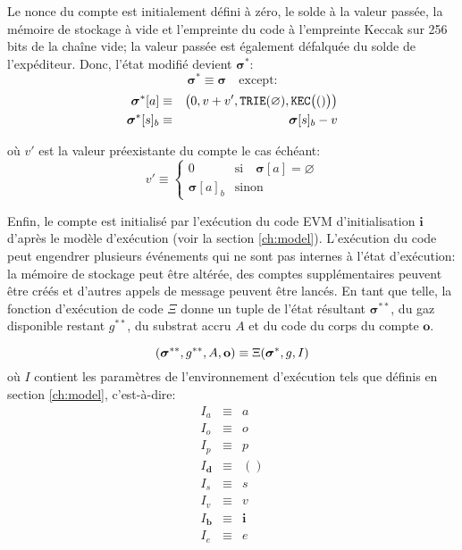 \documentclass[9pt,oneside]{amsart}
\begin{document}
\begin{multicols}{2}
Le nonce du compte est initialement défini à zéro, le solde à la valeur passée, la mémoire de stockage à vide et l'empreinte du code à l'empreinte Keccak sur 256 bits de la chaîne vide; la valeur passée est également défalquée du solde de l'expéditeur. Donc, l'état modifié devient $\boldsymbol{\sigma}^*$:
\begin{equation}
\boldsymbol{\sigma}^* \equiv \boldsymbol{\sigma} \quad \text{except:}
\end{equation}
\begin{eqnarray}
\boldsymbol{\sigma}^*[a] &\equiv& \big( 0, v + v', \mathtt{\tiny TRIE}(\varnothing), \mathtt{\tiny KEC}\big(()\big) \big) \\
\boldsymbol{\sigma}^*[s]_b &\equiv& \boldsymbol{\sigma}[s]_b - v
\end{eqnarray}

où $v'$ est la valeur préexistante du compte le cas échéant:
\begin{equation}
v' \equiv \begin{cases}
0 & \text{si} \quad \boldsymbol{\sigma}[a] = \varnothing\\
\boldsymbol{\sigma}[a]_b & \text{sinon}
\end{cases}
\end{equation}


Enfin, le compte est initialisé par l'exécution du code EVM d'initialisation $\mathbf{i}$ d'après le modèle d'exécution (voir la section \ref{ch:model}). L'exécution du code peut engendrer plusieurs événements qui ne sont pas internes à l'état d'exécution: la mémoire de stockage peut être altérée, des comptes supplémentaires peuvent être créés et d'autres appels de message peuvent être lancés. En tant que telle, la fonction d'exécution de code $\Xi$ donne un tuple de l'état résultant $\boldsymbol{\sigma}^{**}$, du gaz disponible restant $g^{**}$, du substrat accru $A$ et du code du corps du compte $\mathbf{o}$.

\begin{equation}
(\boldsymbol{\sigma}^{**}, g^{**}, A, \mathbf{o}) \equiv \Xi(\boldsymbol{\sigma}^*, g, I) \\
\end{equation}
où $I$ contient les paramètres de l'environnement d'exécution tels que définis en section \ref{ch:model}, c'est-à-dire:
\begin{eqnarray}
I_a & \equiv & a \\
I_o & \equiv & o \\
I_p & \equiv & p \\
I_\mathbf{d} & \equiv & () \\
I_s & \equiv & s \\
I_v & \equiv & v \\
I_\mathbf{b} & \equiv & \mathbf{i} \\
I_e & \equiv & e
\end{eqnarray}


\end{multicols}
\end{document}
